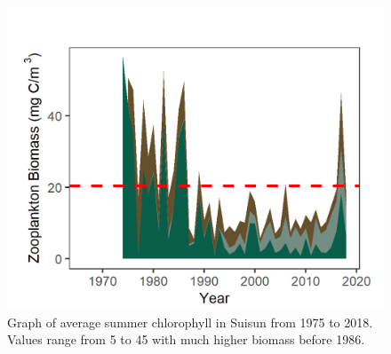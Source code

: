 \documentclass[
]{book}
\begin{document}
\begin{panel-grid}
\begin{columns-nocenter}
\begin{column800}
\begin{expand}
\end{expand}

\end{column800}

\begin{column40}

~

\end{column40}

\begin{column800}

\begin{expand}

\begin{figure}
\includegraphics[width=15.25in]{figures/zoops_sssummer} \caption{Graph of average summer chlorophyll in Suisun from 1975 to 2018. Values range from 5 to 45 with much higher biomass before 1986.}\label{fig:unnamed-chunk-71}
\end{figure}

\end{expand}

\end{column800}

\begin{column40}

~

\end{column40}

\begin{column800}

\begin{expand}


\end{expand}
\end{column800}
\end{columns-nocenter}
\end{panel-grid}
\end{document}
